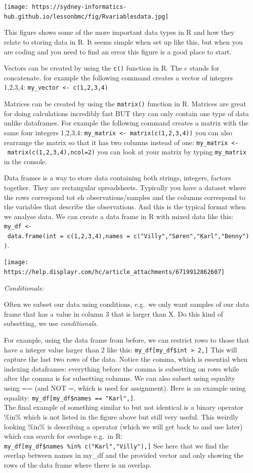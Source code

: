 \documentclass[
]{book}
\begin{document}
\texttt{[image: https://sydney-informatics-hub.github.io/lessonbmc/fig/Rvariablesdata.jpg]}

This figure shows some of the more important data types in R and how
they relate to storing data in R. It seems simple when set up like this,
but when you are coding and you need to find an error this figure is a
good place to start.

Vectors can be created by using the \texttt{c()} function in R. The c
stands for concatenate. for example the following command creates a
vector of integers 1,2,3,4:
\texttt{my\_vector\ \textless{}-\ c(1,2,3,4)}

Matrices can be created by using the \texttt{matrix()} function in R.
Matrices are great for doing calculations incredibly fast BUT they can
only contain one type of data unlike dataframes. For example the
following command creates a matrix with the same four integers 1,2,3,4:
\texttt{my\_matrix\ \textless{}-\ matrix(c(1,2,3,4))} you can also
rearrange the matrix so that it has two columns instead of one:
\texttt{my\_matrix\ \textless{}-\ matrix(c(1,2,3,4),ncol=2)} you can
look at your matrix by typing \texttt{my\_matrix} in the console.

Data frames is a way to store data containing both strings, integers,
factors together. They are rectangular spreadsheets. Typically you have
a dataset where the rows correspond tot eh observations/samples and the
columns correspond to the variables that describe the observations. And
this is the typical format when we analyse data. We can create a data
frame in R with mixed data like this:
\texttt{my\_df\ \textless{}-\ data.frame(int\ =\ c(1,2,3,4),names\ =\ c("Villy","Søren","Karl","Benny"))}.

\texttt{[image: https://help.displayr.com/hc/article\_attachments/6719912862607]}

\emph{Conditionals:}

Often we subset our data using conditions, e.g.~we only want samples of
our data frame that has a value in column 3 that is larger than X. Do
this kind of subsetting, we use \emph{conditionals}.

For example, using the data frame from before, we can restrict rows to
those that have a integer value larger than 2 like this:
\texttt{my\_df{[}my\_df\$int\ \textgreater{}\ 2,{]}} This will capture
the last two rows of the data. Notice the comma, which is essential when
indexing dataframes: everything before the comma is subsetting on rows
while after the comma is for subsetting columns. We can also subset
using equality using == (and NOT =, which is used for assignment). Here
is an example using equality:
\texttt{my\_df{[}my\_df\$names\ ==\ "Karl",{]}}.\\
The final example of something similar to but not identical is a binary
operator \%in\% which is not listed in the figure above but still very
useful. This weirdly looking \%in\% is describing a operator (which we
will get back to and use later) which can search for overlaps e.g.~in R:
\texttt{my\_df{[}my\_df\$names\ \%in\%\ c("Karl","Villy"),{]}} See here
that we find the overlap between names in my\_df and the provided vector
and only showing the rows of the data frame where there is an overlap.
\end{document}
